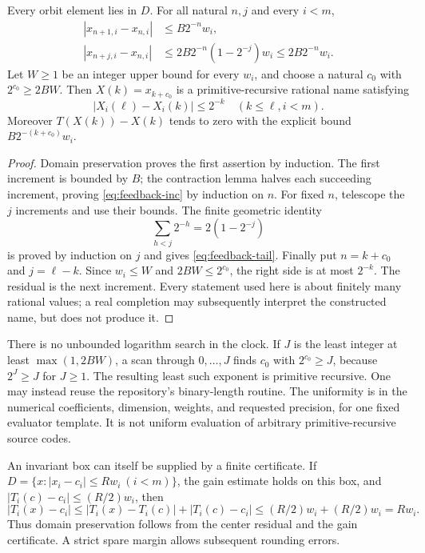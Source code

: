 \begin{theorem}
\label{thm:feedback-name}
Every orbit element lies in $D$. For all natural $n,j$ and every $i<m$,
\begin{align}
 |x_{n+1,i}-x_{n,i}|&\leq B2^{-n}w_i,\label{eq:feedback-inc}\\
 |x_{n+j,i}-x_{n,i}|&\leq
 2B2^{-n}(1-2^{-j})w_i\leq 2B2^{-n}w_i.
 \label{eq:feedback-tail}
\end{align}
Let $W\geq1$ be an integer upper bound for every $w_i$, and choose a natural
$c_0$ with $2^{c_0}\geq2BW$. Then
$X(k)=x_{k+c_0}$ is a primitive-recursive rational name satisfying
\[
 |X_i(\ell)-X_i(k)|\leq2^{-k}\quad(k\leq\ell, i<m).
\]
Moreover $T(X(k))-X(k)$ tends to zero with the explicit bound
$B2^{-(k+c_0)}w_i$.
\end{theorem}
\begin{proof}
Domain preservation proves the first assertion by induction. The first
increment is bounded by $B$; the contraction lemma halves each succeeding
increment, proving \eqref{eq:feedback-inc} by induction on $n$.
For fixed $n$, telescope the $j$ increments and use their bounds. The finite
geometric identity
\[
 \sum_{h<j}2^{-h}=2(1-2^{-j})
\]
is proved by induction on $j$ and gives \eqref{eq:feedback-tail}. Finally put
$n=k+c_0$ and $j=\ell-k$. Since $w_i\leq W$ and $2BW\leq2^{c_0}$, the
right side is at most $2^{-k}$. The residual is the next increment. Every
statement used here is about finitely many rational values; a real completion
may subsequently interpret the constructed name, but does not produce it.
\end{proof}

There is no unbounded logarithm search in the clock. If $J$ is the least
integer at least $\max(1,2BW)$, a scan through $0,\ldots,J$ finds $c_0$
with $2^{c_0}\geq J$, because $2^J\geq J$ for $J\geq1$.
The resulting least such exponent is primitive recursive. One may instead
reuse the repository's binary-length routine. The uniformity is in the
numerical coefficients, dimension, weights, and requested precision, for one
fixed evaluator template. It is not uniform evaluation of arbitrary
primitive-recursive source codes.

An invariant box can itself be supplied by a finite certificate. If
$D=\{x:|x_i-c_i|\leq Rw_i\ (i<m)\}$, the gain estimate holds on this box,
and $|T_i(c)-c_i|\leq(R/2)w_i$, then
\[
 |T_i(x)-c_i|\leq |T_i(x)-T_i(c)|+|T_i(c)-c_i|
 \leq (R/2)w_i+(R/2)w_i=Rw_i.
\]
Thus domain preservation follows from the center residual and the gain
certificate. A strict spare margin allows subsequent rounding errors.

